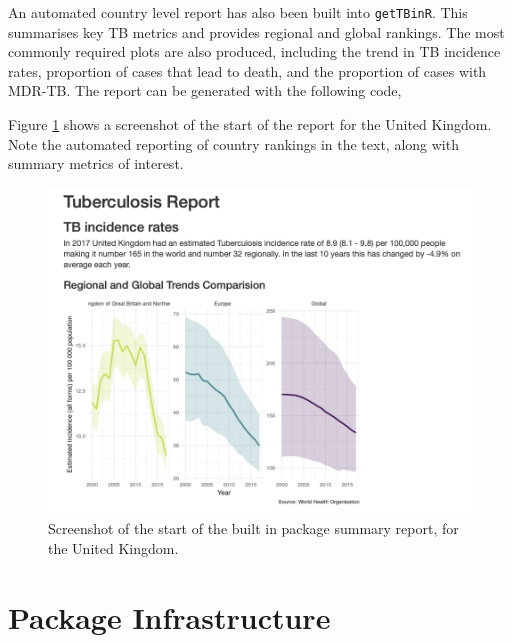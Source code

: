 \documentclass[11pt,twoside]{bristolthesis}
\begin{document}
  An automated country level report has also been built into \texttt{getTBinR}. This summarises key TB metrics and provides regional and global rankings. The most commonly required plots are also produced, including the trend in TB incidence rates, proportion of cases that lead to death, and the proportion of cases with MDR-TB. The report can be generated with the following code,
  \begin{Shaded}
  \begin{Highlighting}[]
  \NormalTok{(} \NormalTok{, } \NormalTok{)}
  \end{Highlighting}
  \end{Shaded}
  Figure \ref{fig:report-snapshot} shows a screenshot of the start of the report for the United Kingdom. Note the automated reporting of country rankings in the text, along with summary metrics of interest.
  \begin{figure}
  
  {\centering \includegraphics[width=0.8\linewidth]{chapters/getTBinR/img/ExampleCountryReport} 
  
  }
  
  \caption{Screenshot of the start of the built in package summary report, for the United Kingdom.}\label{fig:report-snapshot}
  \end{figure}
  \hypertarget{package-infrastructure}{%
  \section{Package Infrastructure}\label{package-infrastructure}}
  
\end{document}
